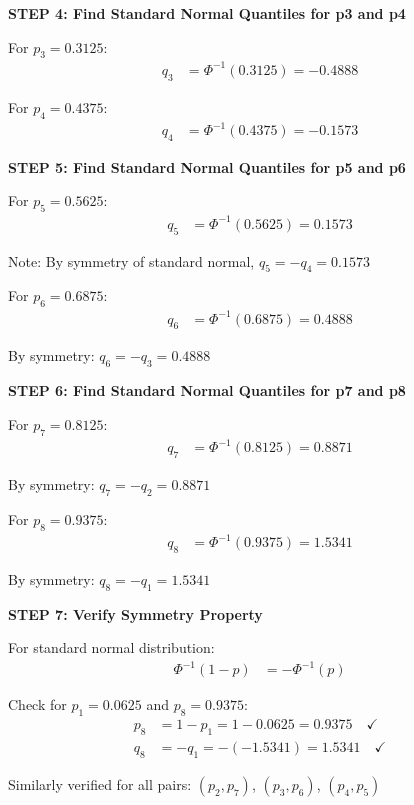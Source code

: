 \documentclass[12pt]{article}
\begin{document}
\begin{solution}
\textbf{STEP 4: Find Standard Normal Quantiles for p3 and p4}

For $p_3 = 0.3125$:
\begin{align*}
q_3 &= \Phi^{-1}(0.3125) = -0.4888
\end{align*}

For $p_4 = 0.4375$:
\begin{align*}
q_4 &= \Phi^{-1}(0.4375) = -0.1573
\end{align*}

\textbf{STEP 5: Find Standard Normal Quantiles for p5 and p6}

For $p_5 = 0.5625$:
\begin{align*}
q_5 &= \Phi^{-1}(0.5625) = 0.1573
\end{align*}

Note: By symmetry of standard normal, $q_5 = -q_4 = 0.1573$

For $p_6 = 0.6875$:
\begin{align*}
q_6 &= \Phi^{-1}(0.6875) = 0.4888
\end{align*}

By symmetry: $q_6 = -q_3 = 0.4888$

\textbf{STEP 6: Find Standard Normal Quantiles for p7 and p8}

For $p_7 = 0.8125$:
\begin{align*}
q_7 &= \Phi^{-1}(0.8125) = 0.8871
\end{align*}

By symmetry: $q_7 = -q_2 = 0.8871$

For $p_8 = 0.9375$:
\begin{align*}
q_8 &= \Phi^{-1}(0.9375) = 1.5341
\end{align*}

By symmetry: $q_8 = -q_1 = 1.5341$

\textbf{STEP 7: Verify Symmetry Property}

For standard normal distribution:
\begin{align*}
\Phi^{-1}(1 - p) &= -\Phi^{-1}(p)
\end{align*}

Check for $p_1 = 0.0625$ and $p_8 = 0.9375$:
\begin{align*}
p_8 &= 1 - p_1 = 1 - 0.0625 = 0.9375 \quad \checkmark \\
q_8 &= -q_1 = -(-1.5341) = 1.5341 \quad \checkmark
\end{align*}

Similarly verified for all pairs: $(p_2, p_7)$, $(p_3, p_6)$, $(p_4, p_5)$


\end{solution}
\end{document}
